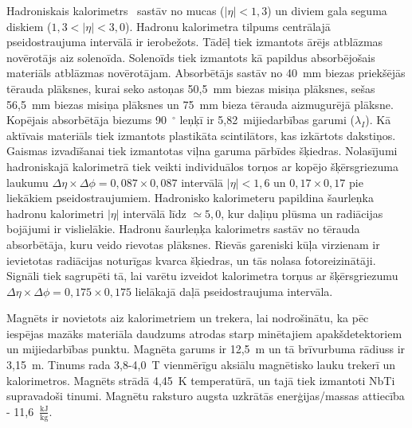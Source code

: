Hadroniskais kalorimetrs~\cite{HCAL_report} sastāv no mucas ($\left|\eta\right|<1,3$) un diviem gala seguma diskiem ($1,3<\left|\eta\right|<3,0$). Hadronu kalorimetra tilpums centrālajā pseidostraujuma intervālā ir ierobežots. Tādēļ tiek izmantots ārējs \gls{atblāzmas novērotājs} aiz solenoīda. Solenoīds tiek izmantots kā papildus absorbējošais materiāls atblāzmas novērotājam. Absorbētājs sastāv no 40~mm biezas priekšējās tērauda plāksnes, kurai seko astoņas 50,5~mm biezas misiņa plāksnes, sešas 56,5~mm biezas misiņa plāksnes un 75~mm bieza tērauda aizmugurējā plāksne. Kopējais absorbētāja biezums 90~$^{\circ}$ leņķī ir 5,82~mijiedarbības garumi ($\lambda_{I}$). Kā aktīvais materiāls tiek izmantots plastikāta scintilātors, kas izkārtots \gls{dakstiņos}. Gaismas izvadīšanai tiek izmantotas viļna garuma pārbīdes šķiedras. Nolasījumi hadroniskajā kalorimetrā tiek veikti individuālos \gls{torņos} ar kopējo šķērsgriezuma laukumu $\Delta\eta\times\Delta\phi=0,087\times0,087$ intervālā $\left|\eta\right|<1,6$ un $0,17\times0,17$ pie liekākiem pseidostraujumiem. Hadronisko kalorimeteru papildina šaurleņka hadronu kalorimetri $\left|\eta\right|$ intervālā līdz $\simeq5,0$, kur daļiņu plūsma un radiācijas bojājumi ir vislielākie. Hadronu šaurleņķa kalorimetrs sastāv no tērauda absorbētāja, kuru veido rievotas plāksnes. Rievās gareniski kūļa virzienam ir ievietotas radiācijas noturīgas kvarca šķiedras, un tās nolasa fotoreizinātāji. Signāli tiek sagrupēti tā, lai varētu izveidot kalorimetra torņus ar šķērsgriezumu $\Delta\eta\times\Delta\phi=0,175\times0,175$ lielākajā daļā pseidostraujuma intervāla. 

Magnēts ir novietots aiz kalorimetriem un trekera, lai nodrošinātu, ka pēc iespējas mazāks materiāla daudzums atrodas starp minētajiem apakšdetektoriem un mijiedarbības punktu. Magnēta garums ir 12,5~m un tā brīvurbuma rādiuss ir 3,15~m. Tinums rada 3,8-4,0~T vienmērīgu aksiālu magnētisko lauku trekerī un kalorimetros. Magnēts strādā 4,45~K temperatūrā, un tajā tiek izmantoti NbTi supravadoši tinumi. Magnētu raksturo augsta uzkrātās enerģijas/massas attiecība - 11,6~$\frac{\text{kJ}}{\text{kg}}$.

